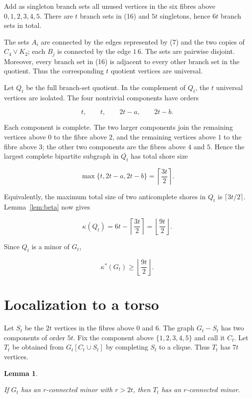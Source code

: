 \documentclass[11pt]{article}
\newtheorem{lemma}[theorem]{Lemma}
\begin{document}
Add as singleton branch sets all unused vertices in the six fibres above
$0,1,2,3,4,5$. There are $t$ branch sets in (16) and $5t$ singletons, hence
$6t$ branch sets in total.

The sets $A_i$ are connected by the edges represented by (7) and the two
copies of $C_4\vee K_2$; each $B_j$ is connected by the edge $1\,6$. The sets
are pairwise disjoint. Moreover, every branch set in (16) is adjacent to every
other branch set in the quotient. Thus the corresponding $t$ quotient
vertices are universal.

Let $Q_t$ be the full branch-set quotient. In the complement of $Q_t$, the
$t$ universal vertices are isolated. The four nontrivial components have
orders

\nopagebreak[4]
\[
t,\qquad t,\qquad 2t-a,\qquad 2t-b.                          \tag{17}
\]

Each component is complete. The two larger components join the remaining
vertices above $0$ to the fibre above $2$, and the remaining vertices above
$1$ to the fibre above $3$; the other two components are the fibres above $4$
and $5$. Hence the largest complete bipartite subgraph in $\overline{Q_t}$ has
total shore size

\nopagebreak[4]
\[
\max\{t,2t-a,2t-b\}=\left\lceil\frac{3t}{2}\right\rceil.
\]

Equivalently, the maximum total size of two anticomplete shores in $Q_t$ is
$\lceil3t/2\rceil$. Lemma~\ref{lem:beta} now gives

\nopagebreak[4]
\[
\kappa(Q_t)
=6t-\left\lceil\frac{3t}{2}\right\rceil
=\left\lfloor\frac{9t}{2}\right\rfloor.                    \tag{18}
\]

Since $Q_t$ is a minor of $G_t$,

\nopagebreak[4]
\[
\kappa^*(G_t)\geq\left\lfloor\frac{9t}{2}\right\rfloor.    \tag{19}
\]

\section{Localization to a torso}


Let $S_t$ be the $2t$ vertices in the fibres above $0$ and $6$. The graph
$G_t-S_t$ has two components of order $5t$. Fix the component above
$\{1,2,3,4,5\}$ and call it $C_t$. Let $T_t$ be obtained from
$G_t[C_t\cup S_t]$ by completing $S_t$ to a clique. Thus $T_t$ has $7t$
vertices.

\begin{lemma}
\label{lem:torso}

If $G_t$ has an $r$-connected minor with $r>2t$, then $T_t$ has an
$r$-connected minor.

\end{lemma}
\end{document}
